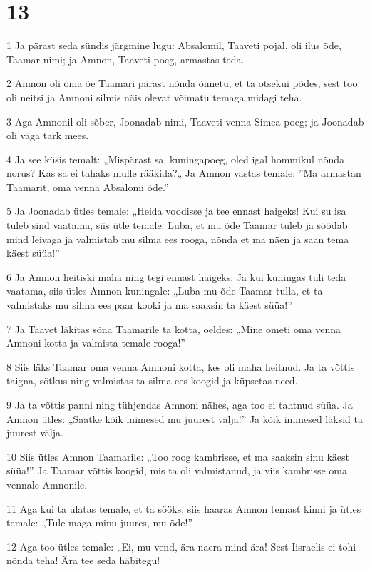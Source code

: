 \chapter{13}

\par 1 Ja pärast seda sündis järgmine lugu: Absalomil, Taaveti pojal, oli ilus õde, Taamar nimi; ja Amnon, Taaveti poeg, armastas teda.
\par 2 Amnon oli oma õe Taamari pärast nõnda õnnetu, et ta otsekui põdes, sest too oli neitsi ja Amnoni silmis näis olevat võimatu temaga midagi teha.
\par 3 Aga Amnonil oli sõber, Joonadab nimi, Taaveti venna Simea poeg; ja Joonadab oli väga tark mees.
\par 4 Ja see küsis temalt: „Mispärast sa, kuningapoeg, oled igal hommikul nõnda norus? Kas sa ei tahaks mulle rääkida?„ Ja Amnon vastas temale: ”Ma armastan Taamarit, oma venna Absalomi õde.”
\par 5 Ja Joonadab ütles temale: „Heida voodisse ja tee ennast haigeks! Kui su isa tuleb sind vaatama, siis ütle temale: Luba, et mu õde Taamar tuleb ja söödab mind leivaga ja valmistab mu silma ees rooga, nõnda et ma näen ja saan tema käest süüa!”
\par 6 Ja Amnon heitiski maha ning tegi ennast haigeks. Ja kui kuningas tuli teda vaatama, siis ütles Amnon kuningale: „Luba mu õde Taamar tulla, et ta valmistaks mu silma ees paar kooki ja ma saaksin ta käest süüa!”
\par 7 Ja Taavet läkitas sõna Taamarile ta kotta, öeldes: „Mine ometi oma venna Amnoni kotta ja valmista temale rooga!”
\par 8 Siis läks Taamar oma venna Amnoni kotta, kes oli maha heitnud. Ja ta võttis taigna, sõtkus ning valmistas ta silma ees koogid ja küpsetas need.
\par 9 Ja ta võttis panni ning tühjendas Amnoni nähes, aga too ei tahtnud süüa. Ja Amnon ütles: „Saatke kõik inimesed mu juurest välja!” Ja kõik inimesed läksid ta juurest välja.
\par 10 Siis ütles Amnon Taamarile: „Too roog kambrisse, et ma saaksin sinu käest süüa!” Ja Taamar võttis koogid, mis ta oli valmistanud, ja viis kambrisse oma vennale Amnonile.
\par 11 Aga kui ta ulatas temale, et ta sööks, siis haaras Amnon temast kinni ja ütles temale: „Tule maga minu juures, mu õde!”
\par 12 Aga too ütles temale: „Ei, mu vend, ära naera mind ära! Sest Iisraelis ei tohi nõnda teha! Ära tee seda häbitegu!
